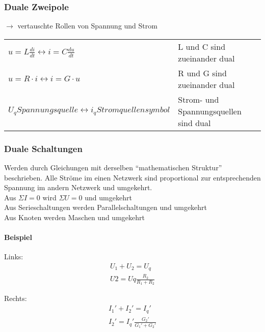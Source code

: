 \subsubsection{Duale Zweipole}
$\rightarrow$ vertauschte Rollen von Spannung und Strom\\
\begin{tabular}{ll}
$u=L\frac{di}{dt} \leftrightarrow i=C\frac{du}{dt}$
& L und C sind zueinander dual\\
$u=R\cdot i \leftrightarrow i=G\cdot u$ &
R und G sind zueinander dual\\
$U_q Spannungsquelle \leftrightarrow i_q Stromquellensymbol$
& Strom- und Spannungsquellen sind dual\\
\end{tabular}
\subsubsection{Duale Schaltungen}
Werden durch Gleichungen mit derselben "`mathematischen Struktur"' beschrieben.
Alle Ströme im einen Netzwerk sind proportional zur entsprechenden Spannung im
andern Netzwerk und umgekehrt.\\
Aus $\Sigma I=0$ wird $\Sigma U=0$ und umgekehrt\\
Aus Serieschaltungen werden Parallelschaltungen und umgekehrt\\
Aus Knoten werden Maschen und umgekehrt\\
\paragraph{Beispiel}
Links:
\begin{align}
U_1+U_2=U_q\nonumber\\
U2=Uq\frac{R_2}{R_1+R_2}\nonumber
\end{align}

Rechts:
\begin{align}
I_1'+I_2'=I_q'\nonumber\\
I_2'=I_q'\frac{G_2'}{G_1'+G_2'}\nonumber
\end{align}

